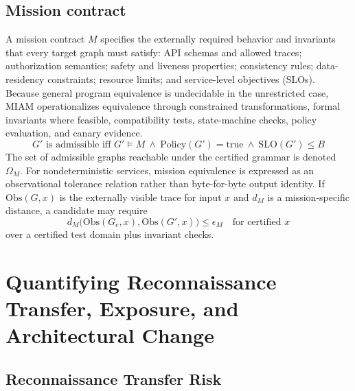 \documentclass[11pt,letterpaper]{article}
\begin{document}
\subsection{Mission contract}

A mission contract $M$ specifies the externally required behavior and invariants that every target graph must satisfy: API schemas and allowed traces; authorization semantics; safety and liveness properties; consistency rules; data-residency constraints; resource limits; and service-level objectives (SLOs). Because general program equivalence is undecidable in the unrestricted case, MIAM operationalizes equivalence through constrained transformations, formal invariants where feasible, compatibility tests, state-machine checks, policy evaluation, and canary evidence.
\begin{equation}\label{eq:admissible}
G' \text{ is admissible iff } G'\models M \ \wedge\ \mathrm{Policy}(G')=\mathrm{true}\ \wedge\ \mathrm{SLO}(G')\le B
\end{equation}
The set of admissible graphs reachable under the certified grammar is denoted $\Omega_M$. For nondeterministic services, mission equivalence is expressed as an observational tolerance relation rather than byte-for-byte output identity. If $\mathrm{Obs}(G,x)$ is the externally visible trace for input $x$ and $d_M$ is a mission-specific distance, a candidate may require
\begin{equation}
d_M\big(\mathrm{Obs}(G_e,x),\mathrm{Obs}(G',x)\big)\le\epsilon_M \quad\text{for certified } x
\end{equation}
over a certified test domain plus invariant checks.

\section{Quantifying Reconnaissance Transfer, Exposure, and Architectural Change}

\subsection{Reconnaissance Transfer Risk}
\end{document}
